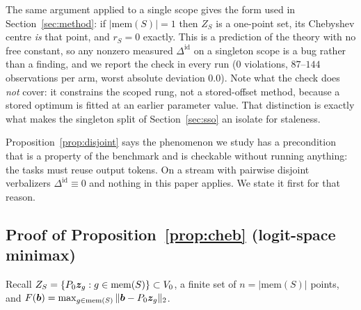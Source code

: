 \begin{remark}
\label{rem:singleton}
The same argument applied to a single scope gives the form used in
Section~\ref{sec:method}: if $|\mathrm{mem}(S)|=1$ then $Z_S$ is a one-point set,
its Chebyshev centre \emph{is} that point, and $r_S=0$ exactly. This is a
prediction of the theory with no free constant, so any nonzero measured
$\Delta^{\mathrm{id}}$ on a singleton scope is a bug rather than a finding, and we
report the check in every run ($0$ violations, $87$--$144$ observations per arm,
worst absolute deviation $0.0$). Note what the check does \emph{not} cover: it
constrains the scoped rung, not a stored-offset method, because a stored optimum
is fitted at an earlier parameter value. That distinction is exactly what makes
the singleton split of Section~\ref{sec:sso} an isolate for staleness.
\end{remark}

\begin{remark}
Proposition~\ref{prop:disjoint} says the phenomenon we study has a precondition
that is a property of the benchmark and is checkable without running anything: the
tasks must reuse output tokens. On a stream with pairwise disjoint verbalizers
$\Delta^{\mathrm{id}}\equiv0$ and nothing in this paper applies. We state it first
for that reason.
\end{remark}

\subsection{Proof of Proposition~\ref{prop:cheb} (logit-space minimax)}
\label{app:proof-cheb}

Recall $Z_S=\{P_0\bm{z}_g : g\in\mathrm{mem}(S)\}\subset V_0$, a finite set of
$n=|\mathrm{mem}(S)|$ points, and
$F(\bm{b})=\max_{g\in\mathrm{mem}(S)}\|\bm{b}-P_0\bm{z}_g\|_2$.

